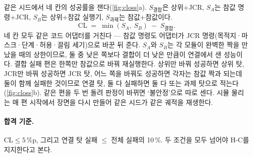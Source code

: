 같은 시드에서 네 칸의 성공률을 잰다(\cref{fig:closs}a). $S_{\text{결합}}$은 상위+JCR, $S_A$는 참값 명령+JCR, $S_B$는 상위+참값 실행기, $S_{\text{과제}}$는 참값+참값이다.
\begin{equation}
  \mathrm{CL} \;=\; \min(S_A,\ S_B) \;-\; S_{\text{결합}}.
\end{equation}
네 칸 모두 같은 코드 어댑터를 거친다 — 참값 명령도 어댑터가 JCR 명령(목적지·마스크·단계·허용·끌림 세기)으로 바꾼 뒤 준다. $S_A$와 $S_B$는 각 모듈이 완벽한 짝을 만났을 때의 상한이므로, 둘 중 낮은 쪽보다 결합이 더 낮은 만큼이 연결에서 샌 성능이다. 결합 실패 편은 한쪽만 참값으로 바꿔 재실행한다. 상위만 바꿔 성공하면 상위 탓, JCR만 바꿔 성공하면 JCR 탓, 어느 쪽을 바꿔도 성공하면 각자는 참값 짝과 되는데 둘이 함께 실패한 것이므로 연결 탓, 둘 다 실패하면 둘 다 또는 과제 탓으로 적는다(\cref{fig:closs}b). 같은 편을 두 번 돌려 판정이 바뀌면 `불안정'으로 따로 센다. 시뮬 물리는 매 편 시작에서 장면을 다시 만들어 같은 시드가 같은 궤적을 재생한다.

\paragraph{합격 기준.} $\mathrm{CL} \le 5$\,\%p, 그리고 연결 탓 실패 $\le$ 전체 실패의 10\,\%. 두 조건을 모두 넘어야 H-C를 지지한다고 본다.
